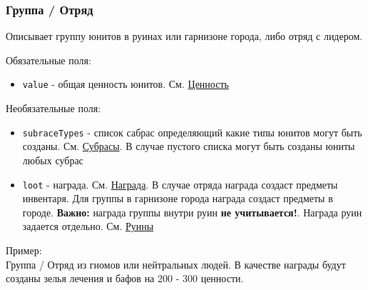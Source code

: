 \subsubsection{Группа / Отряд}
\label{group}
Описывает группу юнитов в руинах или гарнизоне города, либо отряд с лидером.

Обязательные поля:
\begin{itemize}
\item \texttt{value} - общая ценность юнитов. См. \hyperref[value]{Ценность}
\end{itemize}

Необязательные поля:
\begin{itemize}
\item \texttt{subraceTypes} - список сабрас определяющий какие типы юнитов могут быть созданы. См. \hyperref[subraceTypes]{Субрасы}. В случае пустого списка могут быть созданы юниты любых субрас
\item \texttt{loot} - награда. См. \hyperref[loot]{Награда}. В случае отряда награда создаст предметы инвентаря. Для группы в гарнизоне города награда создаст предметы в городе. \textbf{Важно:} награда группы внутри руин \textbf{не учитывается!}. Награда руин задается отдельно. См. \hyperref[ruin]{Руины}
\end{itemize}

Пример:\\
Группа / Отряд из гномов или нейтральных людей.
В качестве награды будут созданы зелья лечения и бафов на 200 - 300 ценности.

\begin{figure}[H]

\end{figure}